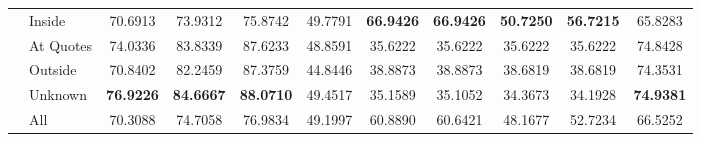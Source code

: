 \begin{table}
\begin{tabular}{llSSSSSSSSS}
 & Inside & 70.6913 & 73.9312 & 75.8742 & 49.7791 & \bfseries 66.9426 & \bfseries 66.9426 & \bfseries 50.7250 & \bfseries 56.7215 & 65.8283 \\
 & At Quotes & 74.0336 & 83.8339 & 87.6233 & 48.8591 & 35.6222 & 35.6222 & 35.6222 & 35.6222 & 74.8428 \\
 & Outside & 70.8402 & 82.2459 & 87.3759 & 44.8446 & 38.8873 & 38.8873 & 38.6819 & 38.6819 & 74.3531 \\
 & Unknown & \bfseries 76.9226 & \bfseries 84.6667 & \bfseries 88.0710 & 49.4517 & 35.1589 & 35.1052 & 34.3673 & 34.1928 & \bfseries 74.9381 \\
 & All & 70.3088 & 74.7058 & 76.9834 & 49.1997 & 60.8890 & 60.6421 & 48.1677 & 52.7234 & 66.5252 \\
\bottomrule
\end{tabular}
\end{table}
